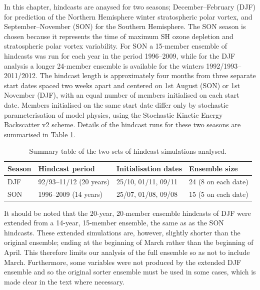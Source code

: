 In this chapter, hindcasts are anaysed for two seasons; December--February (DJF)
for prediction of the Northern Hemisphere winter stratospheric polar vortex, and
September--November (SON) for the Southern Hemisphere. The SON season is chosen
because it represents the time of maximum SH ozone depletion and stratospheric
polar vortex variability. For SON a 15-member ensemble of hindcasts was run for
each year in the period 1996--2009, while for the DJF analysis a longer
24-member ensemble is available for the winters 1992/1993--2011/2012. The
hindcast length is approximately four months from three separate start dates
spaced two weeks apart and centered on 1st August (SON) or 1st November (DJF),
with an equal number of members initialised on each start date. Members
initialised on the same start date differ only by stochastic parameterisation of
model physics, using the Stochastic Kinetic Energy Backscatter v2
\citep[SKEB;][]{Bowler2009} scheme. Details of the hindcast runs for these two
seasons are summarised in Table \ref{tab:seas_runs}.

\begin{table}
\centering
\begin{tabular}{llll} \hline
  Season & Hindcast period                & Initialisation dates & Ensemble size
  \\ \hline
  DJF    & 92/93--11/12 (20 years) & 25/10, 01/11, 09/11  & 24 (8 on each date) \\
  SON    & 1996--2009 (14 years)           & 25/07, 01/08, 09/08  & 15 (5 on each
                                                                   date) \\ \hline
\end{tabular}
\caption{Summary table of the two sets of hindcast simulations analysed.}
\label{tab:seas_runs}
\end{table}

It should be noted that the 20-year, 20-member ensemble hindcasts of DJF were
extended from a 14-year, 15-member ensemble, the same as as the SON
hindcasts. These extended simulations are, however, slightly shorter than the
original ensemble; ending at the beginning of March rather than the beginning of
April. This therefore limits our analysis of the full ensemble so as not to
include March. Furthermore, some variables were not produced by the extended DJF
ensemble and so the original sorter ensemble must be used in some cases, which
is made clear in the text where necessary.


